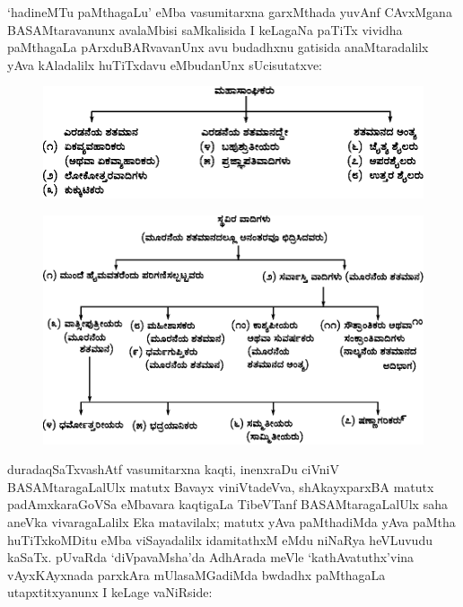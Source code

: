 `hadineMTu paMthagaLu' eMba vasumitarxna garxMthada yuvAnf CAvxMgana BASAMtaravanunx avalaMbisi saMkalisida I keLagaNa paTiTx vividha paMthagaLa pArxduBARvavanUnx avu budadhxnu gatisida anaMtaradalilx yAva kAladalilx huTiTxdavu eMbudanUnx sUcisutatxve:
{}
\begin{figure}[h]
\centering
\includegraphics[scale=.95]{figures/fig1.eps}
\end{figure}
\begin{figure}[h]
\centering
\includegraphics[scale=.87]{figures/fig2.eps}
\end{figure}

duradaqSaTxvashAtf vasumitarxna kaqti, inenxraDu ciVniV BASAMtaragaLalUlx matutx Bavayx viniVtadeVva, shAkayxparxBA matutx padAmxkaraGoVSa eMbavara kaqtigaLa TibeVTanf BASAMtaragaLalUlx saha aneVka vivaragaLalilx Eka matavilalx; matutx yAva paMthadiMda yAva paMtha huTiTxkoMDitu eMba viSayadalilx idamitathxM eMdu niNaRya heVLuvudu kaSaTx. pUvaRda `diVpavaMsha'da AdhArada meVle `kathAvatuthx'vina vAyxKAyxnada parxkAra mUlasaMGadiMda bwdadhx paMthagaLa utapxtitxyanunx I keLage vaNiRside:

